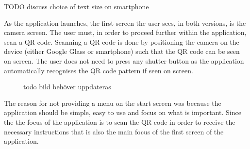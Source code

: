 TODO discuss choice of text size on smartphone

As the application launches, the first screen the user sees, in both versions, is the camera screen. The user must, in order to proceed further within the application, scan a QR code. Scanning a QR code is done by positioning the camera on the device (either Google Glass or smartphone) such that the QR code can be seen on screen. The user does not need to press any shutter button as the application automatically recognises the QR code pattern if seen on screen.%

	
	\begin{figure}[ht!]
		\centering
   		 \qquad
   		 \qquad
		\caption{todo bild behöver uppdateras}
		\label{glassDemoQR}
	\end{figure}

The reason for not providing a menu on the start screen was because the application should be simple, easy to use and focus on what is important. Since the the focus of the application is to scan the QR code in order to receive the necessary instructions that is also the main focus of the first screen of the application.

